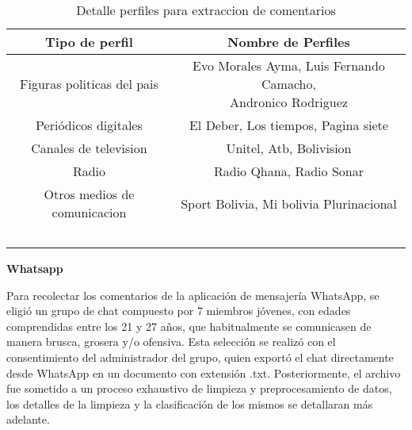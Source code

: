 \begin{table}[!ht]
	\centering
	\begin{tabular}{|c|c|}
		\hline
		\textbf{Tipo de perfil} & \textbf{Nombre de Perfiles} \\ \hline
		Figuras politicas del pais  & \makecell{Evo Morales Ayma, Luis Fernando Camacho, \\  Andronico Rodriguez} \\ \hline
		Periódicos digitales                       & El Deber, Los tiempos, Pagina siete \\ \hline
		Canales de television & Unitel, Atb, Bolivision \\ \hline
		Radio  & Radio Qhana, Radio Sonar \\ \hline
		Otros medios de comunicacion & Sport Bolivia, Mi bolivia Plurinacional \\ \hline
		~ & ~ \\ \hline
	\end{tabular}
	\caption{Detalle perfiles para extraccion de comentarios}
	\label{tbl:16}
\end{table}

\textbf{Whatsapp}


Para recolectar los comentarios de la aplicación de mensajería WhatsApp, se eligió un grupo de chat compuesto por 7 miembros jóvenes, con edades comprendidas entre los 21 y 27 años, que habitualmente se comunicasen de manera brusca, grosera y/o ofensiva. Esta selección se realizó con el consentimiento del administrador del grupo, quien exportó el chat directamente desde WhatsApp en un documento con extensión .txt. Posteriormente, el archivo fue sometido a un proceso exhaustivo de limpieza y preprocesamiento de datos, los detalles de la limpieza y la clasificación de los mismos se detallaran más  adelante.
